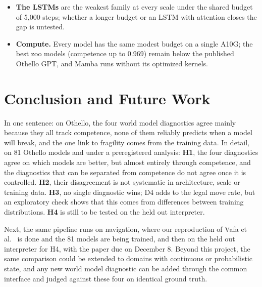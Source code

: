\documentclass[11pt]{scrartcl}
\begin{document}
\begin{itemize}
    history (teacher forcing), which is the preregistered unit; whole game measures are added for Othello as an
    exploratory check (Section~\ref{sec:sequence_method}) and preregistered for the next domains.
    \item \textbf{The LSTMs} are the weakest family at every scale under the shared budget of 5,000 steps;
    whether a longer budget or an LSTM with attention closes the gap is untested.
    \item \textbf{Compute.} Every model has the same modest budget on a single A10G; the best zoo models
    (competence up to 0.969) remain below the published Othello GPT, and Mamba runs without its optimized kernels.
\end{itemize}

\section{Conclusion and Future Work}

In one sentence: on Othello, the four world model diagnostics agree mainly because they all track competence,
none of them reliably predicts when a model will break, and the one link to fragility comes from the training
data. In detail, on 81 Othello models and
under a preregistered analysis: \textbf{H1}, the four diagnostics agree on which models
are better, but almost entirely through competence, and the diagnostics that can be separated from competence
do not agree once it is controlled. \textbf{H2}, their disagreement is not systematic in architecture, scale or
training data. \textbf{H3}, no single diagnostic wins; D4 adds to the legal move rate, but an exploratory check
shows that this comes from differences between training distributions. \textbf{H4} is still to be tested on the
held out interpreter.

Next, the same pipeline runs on navigation, where our reproduction of Vafa et al.~\cite{vafa2024evaluating} is
done and the 81 models are being trained, and then on the held out interpreter for H4, with the paper due on
December 8. Beyond this project, the same comparison could be extended to domains with continuous or
probabilistic state, and any new world model diagnostic can be added through the common interface and judged
against these four on identical ground truth.



\end{document}
